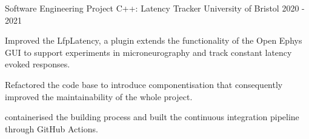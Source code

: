 \begin{cventries}

  \cventry
    {Software Engineering Project} %
    {C++: Latency Tracker} %
    {University of Bristol} %
    {2020 - 2021} %
    {
      \begin{cvitems} %
        \item {Improved the LfpLatency, a plugin extends the functionality of the Open Ephys GUI to support experiments in microneurography and track constant latency evoked responses.}
        \item {Refactored the code base to introduce componentisation that consequently improved the maintainability of the whole project.}
        \item {containerised the building process and built the continuous integration pipeline through GitHub Actions.}
      \end{cvitems}
    }



\end{cventries}
